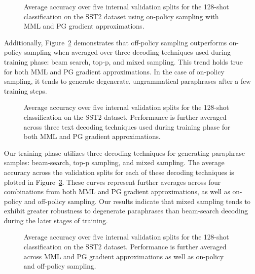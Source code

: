 \documentclass[11pt]{article}
\begin{document}
\begin{figure}[h]
\begin{center}

\end{center}
\caption{Average accuracy over five internal validation splits for the 128-shot classification on the SST2 dataset using on-policy sampling with MML and PG gradient approximations.}
\label{pg-vs-mml-on-policy}
\end{figure}

Additionally, Figure~\ref{off-policy-vs-on-policy} demonstrates that off-policy sampling outperforms on-policy sampling when averaged over three decoding techniques used during training phase: beam search, top-p, and mixed sampling. This trend holds true for both MML and PG gradient approximations. In the case of on-policy sampling, it tends to generate degenerate, ungrammatical paraphrases after a few training steps.

\begin{figure}[h]
\begin{center}

\end{center}
\caption{Average accuracy over five internal validation splits for the 128-shot classification on the SST2 dataset. Performance is further averaged across three text decoding techniques used during training phase for both MML and PG gradient approximations.}
\label{off-policy-vs-on-policy}
\end{figure}

Our training phase utilizes three decoding techniques for generating paraphrase samples: beam-search, top-p sampling, and mixed sampling. The average accuracy across the validation splits for each of these decoding techniques is plotted in Figure~\ref{beam-search-top-mixed}. These curves represent further averages across four combinations from both MML and PG gradient approximations, as well as on-policy and off-policy sampling. Our results indicate that mixed sampling tends to exhibit greater robustness to degenerate paraphrases than beam-search decoding during the later stages of training.

\begin{figure}[h]
\begin{center}

\end{center}
\caption{Average accuracy over five internal validation splits for the 128-shot classification on the SST2 dataset. Performance is further averaged across MML and PG gradient approximations as well as on-policy and off-policy sampling.}
\label{beam-search-top-mixed}
\end{figure}
\end{document}
